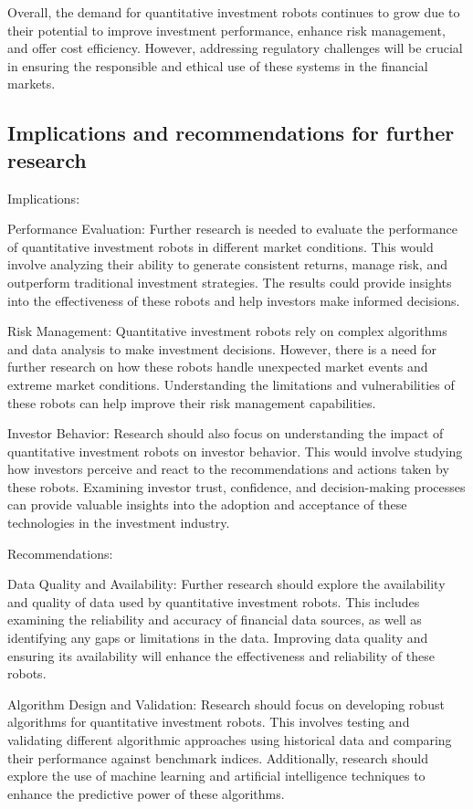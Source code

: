 \documentclass[UTF8]{ctexart}
\begin{document}
Overall, the demand for quantitative investment robots continues to grow due to their potential to improve investment performance, enhance risk management, and offer cost efficiency. However, addressing regulatory challenges will be crucial in ensuring the responsible and ethical use of these systems in the financial markets.

\subsection{Implications and recommendations for further research}
Implications:

Performance Evaluation: Further research is needed to evaluate the performance of quantitative investment robots in different market conditions. This would involve analyzing their ability to generate consistent returns, manage risk, and outperform traditional investment strategies. The results could provide insights into the effectiveness of these robots and help investors make informed decisions.

Risk Management: Quantitative investment robots rely on complex algorithms and data analysis to make investment decisions. However, there is a need for further research on how these robots handle unexpected market events and extreme market conditions. Understanding the limitations and vulnerabilities of these robots can help improve their risk management capabilities.

Investor Behavior: Research should also focus on understanding the impact of quantitative investment robots on investor behavior. This would involve studying how investors perceive and react to the recommendations and actions taken by these robots. Examining investor trust, confidence, and decision-making processes can provide valuable insights into the adoption and acceptance of these technologies in the investment industry.

Recommendations:

Data Quality and Availability: Further research should explore the availability and quality of data used by quantitative investment robots. This includes examining the reliability and accuracy of financial data sources, as well as identifying any gaps or limitations in the data. Improving data quality and ensuring its availability will enhance the effectiveness and reliability of these robots.

Algorithm Design and Validation: Research should focus on developing robust algorithms for quantitative investment robots. This involves testing and validating different algorithmic approaches using historical data and comparing their performance against benchmark indices. Additionally, research should explore the use of machine learning and artificial intelligence techniques to enhance the predictive power of these algorithms.
\end{document}
